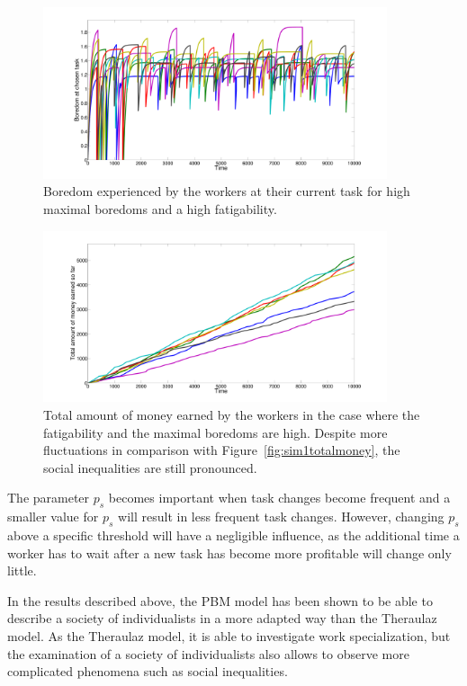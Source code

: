 \begin{figure}[h!]
	\centering
	\includegraphics[width=0.9\textwidth]{figures/moreboredom2.pdf}
	\caption{Boredom experienced by the workers at their current task for high maximal boredoms and a high fatigability.}
	\label{fig:moreboredom2}
\end{figure}

\begin{figure}[h!]
	\centering
	\includegraphics[width=0.9\textwidth]{figures/moreboredom3.pdf}
	\caption{Total amount of money earned by the workers in the case where the fatigability and the maximal boredoms are high. Despite more fluctuations in comparison with Figure~\ref{fig:sim1totalmoney}, the social inequalities are still pronounced.}
	\label{fig:moreboredom3}
\end{figure}

The parameter $p_s$ becomes important when task changes become frequent and a smaller value for $p_s$ will result in less frequent task changes. However, changing $p_s$ above a specific threshold will have a negligible influence, as the additional time a worker has to wait after a new task has become more profitable will change only little.

In the results described above, the PBM model has been shown to be able to describe a society of individualists in a more adapted way than the Theraulaz model. As the Theraulaz model, it is able to investigate work specialization, but the examination of a society of individualists also allows to observe more complicated phenomena such as social inequalities. 

